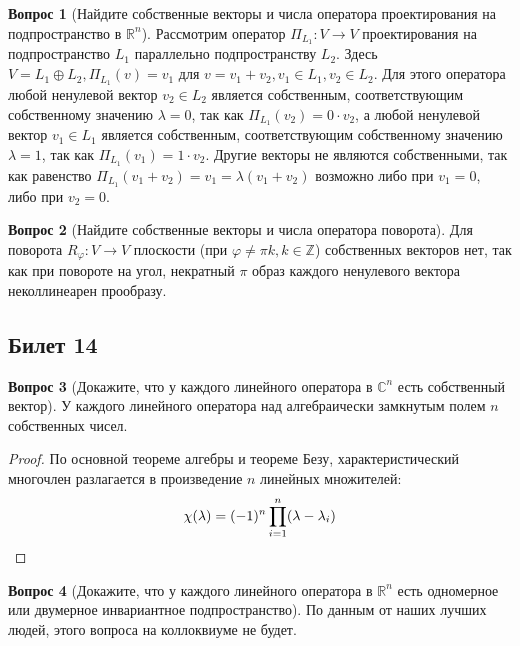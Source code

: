 \documentclass[a4paper,11pt]{article}
\theoremstyle{remark}
\theoremstyle{definition}
\newtheorem{question}{Вопрос}
\numberwithin{question}{subsection}
\begin{document}
\begin{question}[Найдите собственные векторы и числа оператора проектирования на подпространство в \(\mathbb{R}^n\)]
Рассмотрим оператор \(\Pi_{L_1}: V \rightarrow V\) проектирования на подпространство \(L_1\) параллельно подпространству \(L_2\). Здесь \(V = L_1 \oplus L_2, \Pi_{L_1}(v) = v_1\) для \(v = v_1 + v_2, v_1 \in L_1, v_2 \in L_2\). Для этого оператора любой ненулевой вектор \(v_2 \in L_2\) является собственным, соответствующим собственному значению \(\lambda = 0\), так как \(\Pi_{L_1}(v_2) = 0 \cdot v_2\), а любой ненулевой вектор \(v_1 \in L_1\) является собственным, соответствующим собственному значению \(\lambda = 1\), так как \(\Pi_{L_1}(v_1) = 1 \cdot v_2\). Другие векторы не являются собственными, так как равенство \(\Pi_{L_1}(v_1 + v_2) = v_1 = \lambda{}(v_1 + v_2)\) возможно либо при \(v_1 = 0\), либо при \(v_2 = 0\).
\end{question}

\begin{question}[Найдите собственные векторы и числа оператора поворота]
Для поворота \(R_\varphi: V \rightarrow V\) плоскости (при \(\varphi \neq \pi{}k, k \in \mathbb{Z}\)) собственных векторов нет, так как при повороте на угол, некратный \(\pi\) образ каждого ненулевого вектора неколлинеарен прообразу. 
\end{question}


\subsection{Билет 14}
\begin{question}[Докажите, что у каждого линейного оператора в \(\mathbb{C}^n\) есть собственный вектор]
У каждого линейного оператора над алгебраически замкнутым полем \(n\) собственных чисел.
\begin{proof}
По основной теореме алгебры и теореме Безу, характеристический многочлен разлагается в произведение \(n\) линейных множителей:
\begin{equation*}
	\chi(\lambda) = (-1)^n \prod^n_{i = 1}(\lambda - \lambda_i) \qedhere
\end{equation*}
\end{proof}
\end{question}

\begin{question}[Докажите, что у каждого линейного оператора в \(\mathbb{R}^n\) есть одномерное или двумерное инвариантное подпространство]
По данным от наших лучших людей, этого вопроса на коллоквиуме не будет.
\end{question}
\end{document}
